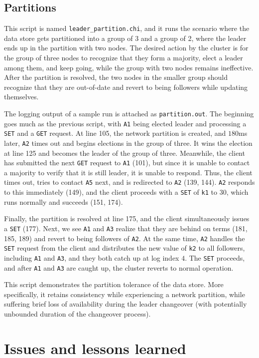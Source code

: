 \documentclass[psamsfonts]{amsart}
\begin{document}
\subsection{Partitions}
This script is named \verb|leader_partition.chi|, and it runs the scenario where the data store gets partitioned into a group of 3 and a group of 2, where the leader ends up in the partition with two nodes. The desired action by the cluster is for the group of three nodes to recognize that they form a majority, elect a leader among them, and keep going, while the group with two nodes remains ineffective. After the partition is resolved, the two nodes in the smaller group should recognize that they are out-of-date and revert to being followers while updating themselves.

The logging output of a sample run is attached as \verb|partition.out|. The beginning goes much as the previous script, with \verb|A1| being elected leader and processing a \verb|SET| and a \verb|GET| request. At line 105, the network partition is created, and $180$ms later, \verb|A2| times out and begins elections in the group of three. It wins the election at line 125 and becomes the leader of the group of three. Meanwhile, the client has submitted the next \verb|GET| request to \verb|A1| (101), but since it is unable to contact a majority to verify that it is still leader, it is unable to respond. Thus, the client times out, tries to contact \verb|A5| next, and is redirected to \verb|A2| (139, 144). \verb|A2| responds to this immediately (149), and the client proceeds with a \verb|SET| of \verb|k1| to $30$, which runs normally and succeeds (151, 174). 

Finally, the partition is resolved at line 175, and the client simultaneously issues a \verb|SET| (177). Next, we see \verb|A1| and \verb|A3| realize that they are behind on terms (181, 185, 189) and revert to being followers of \verb|A2|. At the same time, \verb|A2| handles the \verb|SET| request from the client and distributes the new value of \verb|k2| to all followers, including \verb|A1| and \verb|A3|, and they both catch up at log index $4$. The \verb|SET| proceeds, and after \verb|A1| and \verb|A3| are caught up, the cluster reverts to normal operation.

This script demonstrates the partition tolerance of the data store. More specifically, it retains consistency while experiencing a network partition, while suffering brief loss of availability during the leader changeover (with potentially unbounded duration of the changeover process).
\section{Issues and lessons learned}
\end{document}
